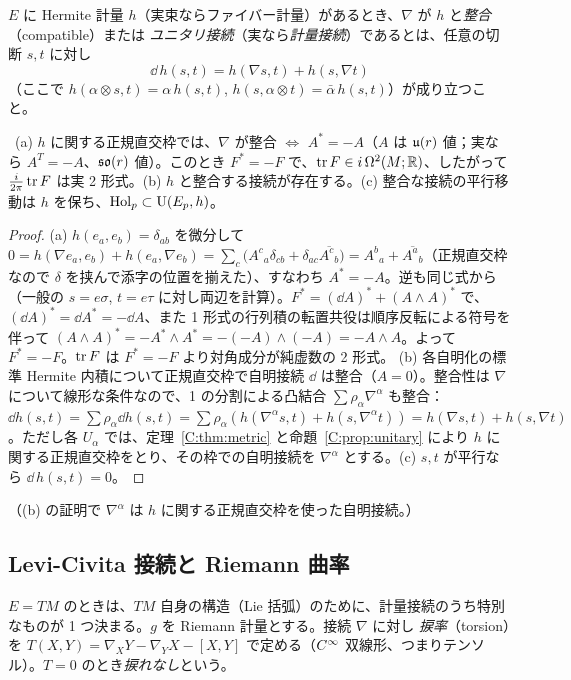 \begin{defn}[計量接続]\label{C:def:metcon}
$E$ に Hermite 計量 $h$（実束ならファイバー計量）があるとき、$\nabla$ が $h$ と\emph{整合}（compatible）または \emph{ユニタリ接続}（実なら\emph{計量接続}）であるとは、任意の切断 $s,t$ に対し
\[
\dd\,h(s,t)=h(\nabla s,t)+h(s,\nabla t)
\]
（ここで $h(\alpha\otimes s,t)=\alpha\,h(s,t)$, $h(s,\alpha\otimes t)=\bar\alpha\,h(s,t)$）が成り立つこと。
\end{defn}
\begin{prop}\label{C:prop:unit}\tP\
(a) $h$ に関する正規直交枠では、$\nabla$ が整合 $\Leftrightarrow$ $A^*=-A$（$A$ は $\mathfrak{u}(r)$ 値；実なら $A^T=-A$、$\mathfrak{so}(r)$ 値）。このとき $F^*=-F$ で、$\operatorname{tr} F\in i\,\Omega^2(M;\mathbb R)$、したがって $\frac i{2\pi}\operatorname{tr} F$ は実 2 形式。(b) $h$ と整合する接続が存在する。(c) 整合な接続の平行移動は $h$ を保ち、$\operatorname{Hol}_p\subset\mathrm{U}(E_p,h)$。
\end{prop}
\begin{proof}
(a) $h(e_a,e_b)=\delta_{ab}$ を微分して $0=h(\nabla e_a,e_b)+h(e_a,\nabla e_b)=\sum_c\bigl(A^c{}_a\delta_{cb}+\delta_{ac}\overline{A^c{}_b}\bigr)=A^b{}_a+\overline{A^a{}_b}$（正規直交枠なので $\delta$ を挟んで添字の位置を揃えた）、すなわち $A^*=-A$。逆も同じ式から（一般の $s=e\sigma$, $t=e\tau$ に対し両辺を計算）。$F^*=(\dd A)^*+(A\wedge A)^*$ で、$(\dd A)^*=\dd A^*=-\dd A$、また 1 形式の行列積の転置共役は順序反転による符号を伴って $(A\wedge A)^*=-A^*\wedge A^*=-(-A)\wedge(-A)=-A\wedge A$。よって $F^*=-F$。$\operatorname{tr} F$ は $F^*=-F$ より対角成分が純虚数の 2 形式。
(b) 各自明化の標準 Hermite 内積について正規直交枠で自明接続 $\dd$ は整合（$A=0$）。整合性は $\nabla$ について線形な条件なので、1 の分割による凸結合 $\sum\rho_\alpha\nabla^\alpha$ も整合：$\dd h(s,t)=\sum\rho_\alpha\dd h(s,t)=\sum\rho_\alpha(h(\nabla^\alpha s,t)+h(s,\nabla^\alpha t))=h(\nabla s,t)+h(s,\nabla t)$。ただし各 $U_\alpha$ では、定理~\ref{C:thm:metric} と命題~\ref{C:prop:unitary} により $h$ に関する正規直交枠をとり、その枠での自明接続を $\nabla^\alpha$ とする。(c) $s,t$ が平行なら $\dd\,h(s,t)=0$。
\end{proof}
（(b) の証明で $\nabla^\alpha$ は $h$ に関する正規直交枠を使った自明接続。）

\subsection{Levi-Civita 接続と Riemann 曲率}
\label{C:ss:LC}
$E=TM$ のときは、$TM$ 自身の構造（Lie 括弧）のために、計量接続のうち特別なものが 1 つ決まる。$g$ を Riemann 計量とする。接続 $\nabla$ に対し \emph{捩率}（torsion）を $T(X,Y)=\nabla_XY-\nabla_YX-[X,Y]$ で定める（$C^\infty$ 双線形、つまりテンソル）。$T=0$ のとき\emph{捩れなし}という。

